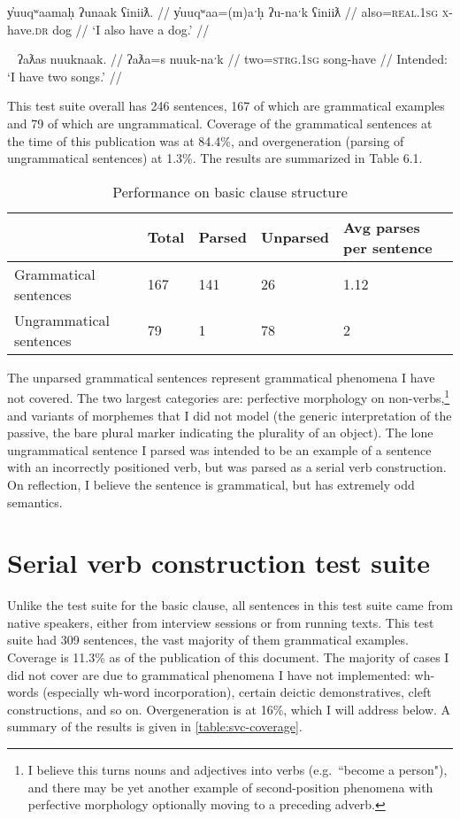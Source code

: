 \ex \label{ex:alsohavedog}
\begingl
\glpreamble y̓uuqʷaamaḥ ʔunaak ʕiniiƛ. //
\gla y̓uuqʷaa=(m)aˑḥ ʔu-naˑk ʕiniiƛ //
\glb also=\textsc{real.1sg} \textsc{x}-have.\textsc{dr} dog //
\glft `I also have a dog.' //
\endgl
\xe

\ex~ \label{ex:*twohavesong}
\begingl
\glpreamble *ʔaƛas nuuknaak. //
\gla ʔaƛa=s nuuk-naˑk //
\glb two=\textsc{strg.1sg} song-have //
\glft Intended: `I have two songs.' //
\endgl
\xe

This test suite overall has 246 sentences, 167 of which are grammatical examples and 79 of which are ungrammatical. Coverage of the grammatical sentences at the time of this publication was at 84.4\%, and overgeneration (parsing of ungrammatical sentences) at 1.3\%. The results are summarized in Table 6.1.

\begin{table}[H]
\centering
\label{table:clause-coverage}
\caption{Performance on basic clause structure}
\begin{tabular}{l|llll}
 & Total & Parsed & Unparsed & Avg parses per sentence\\ \hline
Grammatical sentences & 167 & 141 & 26 & 1.12 \\ \hline
Ungrammatical sentences & 79 & 1 & 78 & 2
\end{tabular}
\end{table}

The unparsed grammatical sentences represent grammatical phenomena I have not covered. The two largest categories are: perfective morphology on non-verbs,\footnote{I believe this turns nouns and adjectives into verbs (e.g.\ ``become a person"), and there may be yet another example of second-position phenomena with perfective morphology optionally moving to a preceding adverb.} and variants of morphemes that I did not model (the generic interpretation of the passive, the bare plural marker indicating the plurality of an object). The lone ungrammatical sentence I parsed was intended to be an example of a sentence with an incorrectly positioned verb, but was parsed as a serial verb construction. On reflection, I believe the sentence is grammatical, but has extremely odd semantics.

\section{Serial verb construction test suite} \label{ch:results:sv}

Unlike the test suite for the basic clause, all sentences in this test suite came from native speakers, either from interview sessions or from running texts. This test suite had 309 sentences, the vast majority of them grammatical examples. Coverage is 11.3\% as of the publication of this document. The majority of cases I did not cover are due to grammatical phenomena I have not implemented: wh-words (especially wh-word incorporation), certain deictic demonstratives, cleft constructions, and so on. Overgeneration is at 16\%, which I will address below. A summary of the results is given in \cref{table:svc-coverage}.

